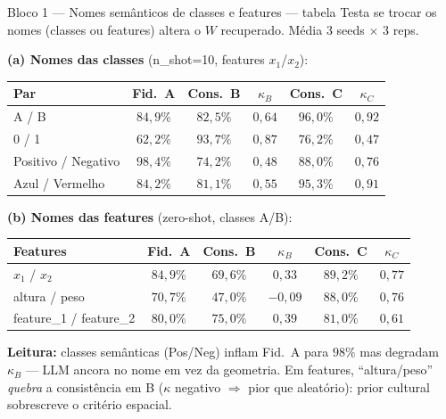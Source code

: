 \documentclass[aspectratio=169,10pt]{beamer}
\begin{document}
\begin{frame}{Bloco 1 --- Nomes sem\^anticos de classes e features --- tabela}
  \scriptsize
  Testa se trocar os nomes (classes ou features) altera o $W$ recuperado. M\'edia 3 seeds $\times$ 3 reps.
  \medskip

  \textbf{(a) Nomes das classes} (n\_shot=10, features $x_1$/$x_2$):
  \begin{center}
  \begin{tabular}{lccccc}
    \toprule
    Par                  & Fid.\ A & Cons.\ B & $\kappa_B$ & Cons.\ C & $\kappa_C$ \\
    \midrule
    A / B                & $84{,}9\%$ & $82{,}5\%$ & $0{,}64$ & $96{,}0\%$ & $0{,}92$ \\
    0 / 1                & $62{,}2\%$ & $93{,}7\%$ & $0{,}87$ & $76{,}2\%$ & $0{,}47$ \\
    Positivo / Negativo  & $98{,}4\%$ & $74{,}2\%$ & $0{,}48$ & $88{,}0\%$ & $0{,}76$ \\
    Azul / Vermelho      & $84{,}2\%$ & $81{,}1\%$ & $0{,}55$ & $95{,}3\%$ & $0{,}91$ \\
    \bottomrule
  \end{tabular}
  \end{center}
  \medskip

  \textbf{(b) Nomes das features} (zero-shot, classes A/B):
  \begin{center}
  \begin{tabular}{lccccc}
    \toprule
    Features                & Fid.\ A & Cons.\ B & $\kappa_B$ & Cons.\ C & $\kappa_C$ \\
    \midrule
    $x_1$ / $x_2$           & $84{,}9\%$ & $69{,}6\%$ & $0{,}33$  & $89{,}2\%$ & $0{,}77$ \\
    altura / peso           & $70{,}7\%$ & $47{,}0\%$ & $-0{,}09$ & $88{,}0\%$ & $0{,}76$ \\
    feature\_1 / feature\_2 & $80{,}0\%$ & $75{,}0\%$ & $0{,}39$  & $81{,}0\%$ & $0{,}61$ \\
    \bottomrule
  \end{tabular}
  \end{center}
  \tiny
  \textbf{Leitura:} classes sem\^anticas (Pos/Neg) inflam Fid.\ A para $98\%$ mas degradam $\kappa_B$ --- LLM ancora no nome em vez da geometria. Em features, ``altura/peso'' \emph{quebra} a consist\^encia em B ($\kappa$ negativo $\Rightarrow$ pior que aleat\'orio): prior cultural sobrescreve o crit\'erio espacial.
\end{frame}
\end{document}
